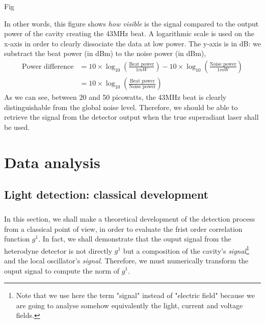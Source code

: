 \documentclass[12pt]{report}
\begin{document}
Fig

In other words, this figure shows \textit{how visible} is the signal compared to the output power of the cavity creating the 43MHz beat. A logarithmic scale is used on the x-axis in order to clearly dissociate the data at low power. The y-axis is in dB: we substract the beat power (in dBm) to the noise power (in dBm),
\begin{align}
\textrm{Power difference} &= 10 \times \log_{10}\left( \frac{\textrm{Beat power}}{1mW} \right) - 10 \times \log_{10}\left( \frac{\textrm{Noise power}}{1mW} \right) \\
&= 10 \times \log_{10}\left( \frac{\textrm{Beat power}}{\textrm{Noise power}} \right)
\end{align}
As we can see, between 20 and 50 picowatts, the 43MHz beat is clearly distinguishable from the global noise level. Therefore, we should be able to retrieve the signal from the detector output when the true superadiant laser shall be used.

\chapter{Data analysis}
\section{Light detection: classical development}
\paragraph{}

In this section, we shall make a theoretical development of the detection process from a classical point of view, in order to evaluate the frist order correlation function $g^1$. In fact, we shall demonstrate that the ouput signal from the heterodyne detector is not directly $g^1$ but a composition of the cavity's \textit{signal}\footnote{Note that we use here the term "signal" instead of "electric field" because we are going to analyse somehow equivalently the light, current and voltage fields.} and the local oscillator's \textit{signal}. Therefore, we must numerically transform the ouput signal to compute the norm of $g^1$.
\end{document}
